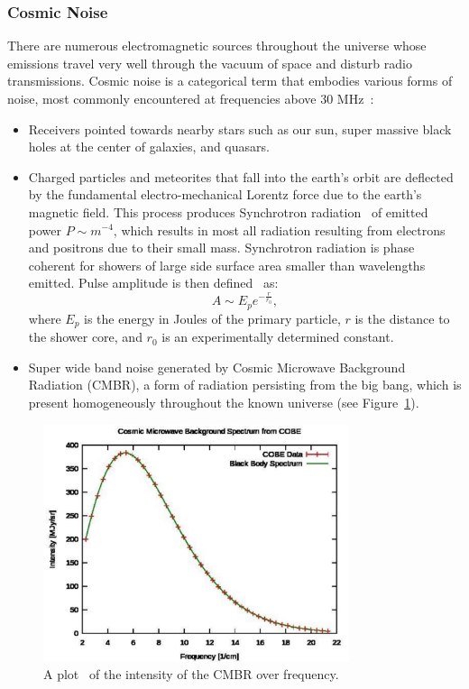 \subsubsection{Cosmic Noise}
There are numerous electromagnetic sources throughout the universe whose emissions travel very well through the vacuum of space and disturb radio transmissions. Cosmic noise is a categorical term that embodies various forms of noise, most commonly encountered at frequencies above 30 MHz~\cite{cosmic}:
\begin{itemize}
\item Receivers pointed towards nearby stars such as our sun, super massive black holes at the center of galaxies, and quasars.
\item Charged particles and meteorites that fall into the earth's orbit are deflected by the fundamental electro-mechanical Lorentz force due to the earth's magnetic field. This process produces Synchrotron radiation~\cite{cosmic} of emitted power $P \sim m^{-4}$, which results in most all radiation resulting from electrons and positrons due to their small mass. Synchrotron radiation is phase coherent for showers of large side surface area smaller than wavelengths emitted. Pulse amplitude is then defined~\cite{cosmic} as:
\begin{equation}
\label{eq:synchrad}
A \sim E_p e^{-\frac{r}{r_0}},
\end{equation}
where $E_p$ is the energy in Joules of the primary particle, $r$ is the distance to the shower core, and $r_0$ is an experimentally determined constant.
\item Super wide band noise generated by Cosmic Microwave Background Radiation (CMBR), a form of radiation persisting from the big bang, which is present homogeneously throughout the known universe (see Figure~\ref{fig:cmbr}).
\end{itemize}

\FloatBarrier
\begin{figure}[ht!]
	\centering	\includegraphics[width=0.8\textwidth,keepaspectratio]{figs/cmbr.png}
    \caption{A plot~\cite{cmbr} of the intensity of the CMBR over frequency.} 
\label{fig:cmbr}      
\end{figure}
\FloatBarrier

